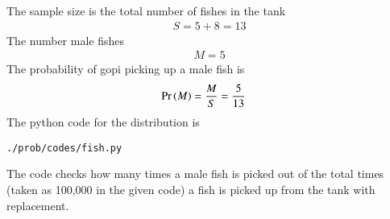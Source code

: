 The sample size is the total number of fishes in the tank 
\begin{align}
S=5+8=13
\end{align}
The number male fishes 
\begin{align}
M=5
\end{align}
The probability of gopi picking up a male fish is
\begin{align}
\Pr\left(M\right) = \frac{M}{S} &= \frac{5}{13}
\end{align}
The python code for the distribution is
\begin{lstlisting}
./prob/codes/fish.py
\end{lstlisting}
The code checks how many times a male fish is picked out of the total times (taken as 100,000 in the given code) a fish is picked up from the tank with replacement.
